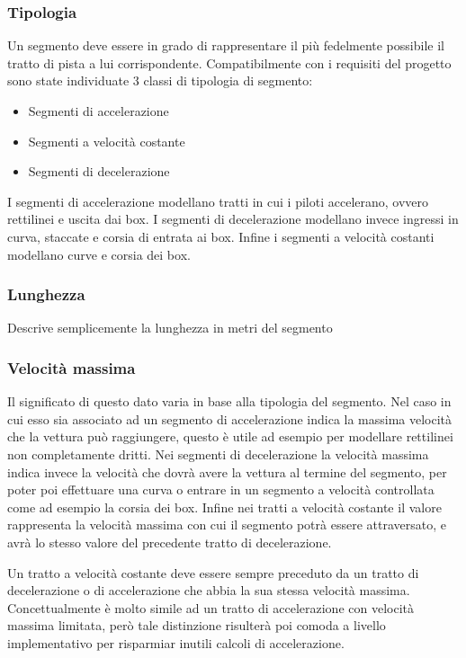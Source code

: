 \documentclass[a4paper,11pt, twoside]{book}
\begin{document}
	\subsubsection{Tipologia}
	  Un segmento deve essere in grado di rappresentare il più fedelmente possibile il tratto di pista
	  a lui corrispondente. Compatibilmente con i requisiti del progetto sono state individuate 3 classi
	  di tipologia di segmento:
	  
	  \begin{itemize}
	    \item Segmenti di accelerazione
	    \item Segmenti a velocità costante
	    \item Segmenti di decelerazione
	  \end{itemize}
	  
	  I segmenti di accelerazione modellano tratti in cui i piloti accelerano, ovvero rettilinei e uscita dai box. I segmenti di
	  decelerazione modellano invece ingressi in curva, staccate e corsia di entrata ai box. Infine
	  i segmenti a velocità costanti modellano curve e corsia dei box.
	  
	\subsubsection{Lunghezza}
	  Descrive semplicemente la lunghezza in metri del segmento
	
	\subsubsection{Velocità massima}
	  Il significato di questo dato varia in base alla tipologia del segmento. Nel caso
	  in cui esso sia associato ad un segmento di accelerazione indica la massima velocità che la vettura può raggiungere,
	  questo è utile ad esempio per modellare rettilinei non completamente dritti.
	  Nei segmenti di decelerazione la velocità massima indica invece la velocità che dovrà avere la vettura al termine del
	  segmento, per poter poi effettuare una curva o entrare in un segmento a velocità controllata come ad esempio la
	  corsia dei box.
	  Infine nei tratti a velocità costante il valore rappresenta la velocità massima con cui il segmento potrà essere
	  attraversato, e avrà lo stesso valore del precedente tratto di decelerazione.
	  
	  Un tratto a velocità costante deve essere sempre preceduto da un tratto di decelerazione o di accelerazione
	  che abbia la sua stessa velocità massima. Concettualmente è molto simile ad un tratto di accelerazione
	  con velocità massima limitata, però tale distinzione risulterà poi comoda a livello implementativo
	  per risparmiar inutili calcoli di accelerazione.
	  
\end{document}
